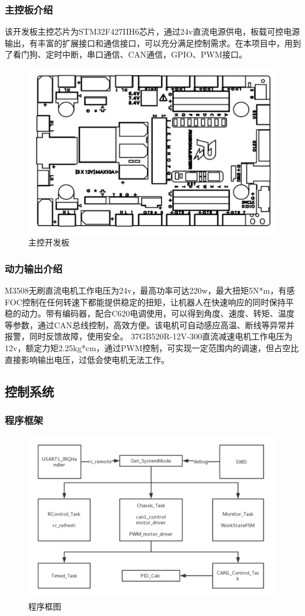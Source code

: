 \documentclass[12pt]{article}
\begin{document}
\begin{CJK}{UTF8}{gbsn}
\subsubsection{主控板介绍}
该开发板主控芯片为STM32F427IIH6芯片，通过24v直流电源供电，板载可控电源输出，有丰富的扩展接口和通信接口，可以充分满足控制需求。在本项目中，用到了看门狗、定时中断，串口通信、CAN通信，GPIO、PWM接口。
 \begin{figure}[H]
\centering
\includegraphics[width=.8\textwidth]{chap5//fig5.jpg}
\caption{主控开发板}
\end{figure}
\subsubsection{动力输出介绍}
M3508无刷直流电机工作电压为24v，最高功率可达220w，最大扭矩5N*m，有感FOC控制在任何转速下都能提供稳定的扭矩，让机器人在快速响应的同时保持平稳的动力。带有编码器，配合C620电调使用，可以得到角度、速度、转矩、温度等参数，通过CAN总线控制，高效方便。该电机可自动感应高温、断线等异常并报警，同时反馈故障，使用安全。
37GB520R-12V-300直流减速电机工作电压为12v，额定力矩2.25kg*cm，通过PWM控制，可实现一定范围内的调速，但占空比直接影响输出电压，过低会使电机无法工作。
\subsection{控制系统}
\subsubsection{程序框架}
 \begin{figure}[H]
\centering
\includegraphics[width=.8\textwidth]{chap5//fig6.jpg}
\caption{程序框图}
\end{figure}

\end{CJK}
\end{document}
